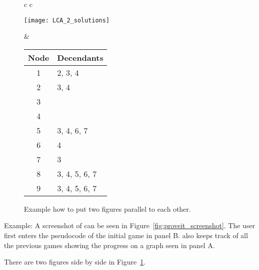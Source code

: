 \begin{figure} [htbp]
\begin{tabular}{c c}
%
\begin{minipage}{0.45\textwidth}
\texttt{[image: LCA\_2\_solutions]}
\end{minipage}
%
&
\begin{minipage}{0.55\textwidth}
\centering
\begin{tabular}{cl}
  \toprule
	Node & Decendants \\
  \midrule
  1 & 2, 3, 4 \\
  2 & 3, 4 \\
  3 & \\
  4 & \\
  5 & 3, 4, 6, 7 \\
  6 & 4 \\
  7 & 3 \\
  8 & 3, 4, 5, 6, 7\\
  9 & 3, 4, 5, 6, 7\\
  \bottomrule
\end{tabular}
\end{minipage}
\end{tabular}
%
\caption{Example how to put two figures parallel to each other.}
\label{fig:LCA_2_solutions}
\end{figure}


Example: A screenshot of \proveit can be seen in Figure~\ref{fig:proveit_screenshot}. The user first enters the pseudocode of the initial game in panel B. \proveit also keeps track of all the previous games showing the progress on a graph seen in panel A.

There are two figures side by side in Figure~\ref{fig:LCA_2_solutions}.
